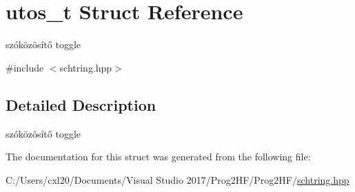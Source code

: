 \hypertarget{structutos__t}{}\section{utos\+\_\+t Struct Reference}
\label{structutos__t}


szóközösítő toggle  




{\ttfamily \#include $<$schtring.\+hpp$>$}



\subsection{Detailed Description}
szóközösítő toggle 

The documentation for this struct was generated from the following file\+:\begin{DoxyCompactItemize}
\item 
C\+:/\+Users/cxl20/\+Documents/\+Visual Studio 2017/\+Prog2\+H\+F/\+Prog2\+H\+F/\mbox{\hyperlink{schtring_8hpp}{schtring.\+hpp}}\end{DoxyCompactItemize}

